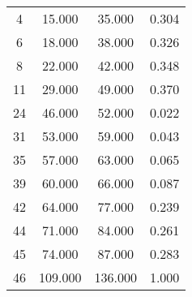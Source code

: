 % 
\begin{tabular}{cccc}
  \hline
  \hline
4 & 15.000 & 35.000 & 0.304 \\ 
  6 & 18.000 & 38.000 & 0.326 \\ 
  8 & 22.000 & 42.000 & 0.348 \\ 
  11 & 29.000 & 49.000 & 0.370 \\ 
  24 & 46.000 & 52.000 & 0.022 \\ 
  31 & 53.000 & 59.000 & 0.043 \\ 
  35 & 57.000 & 63.000 & 0.065 \\ 
  39 & 60.000 & 66.000 & 0.087 \\ 
  42 & 64.000 & 77.000 & 0.239 \\ 
  44 & 71.000 & 84.000 & 0.261 \\ 
  45 & 74.000 & 87.000 & 0.283 \\ 
  46 & 109.000 & 136.000 & 1.000 \\ 
   \hline
\end{tabular}
